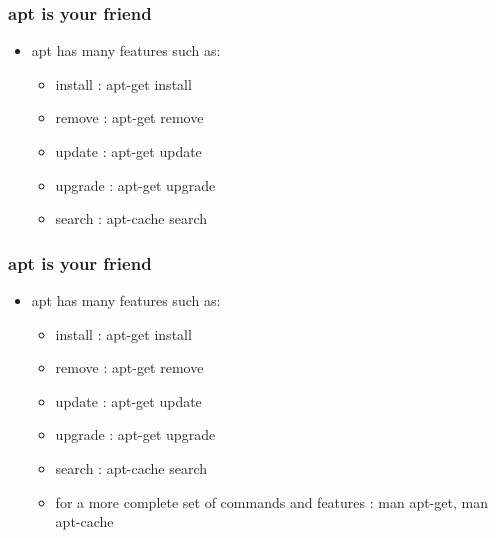 \begin{frame}
    \frametitle{apt is your friend}
    \begin{itemize}
        \item apt has many features such as:
        \begin{itemize}
            \item install : apt-get install
            \item remove : apt-get remove
            \item update : apt-get update
            \item upgrade : apt-get upgrade
            \item search : apt-cache search
        \end{itemize}
    \end{itemize}
\end{frame}
\begin{frame}
    \frametitle{apt is your friend}
    \begin{itemize}
        \item apt has many features such as:
        \begin{itemize}
            \item install : apt-get install
            \item remove : apt-get remove
            \item update : apt-get update
            \item upgrade : apt-get upgrade
            \item search : apt-cache search
            \item for a more complete set of commands and features : man
            apt-get, man apt-cache
        \end{itemize}
    \end{itemize}
\end{frame}
